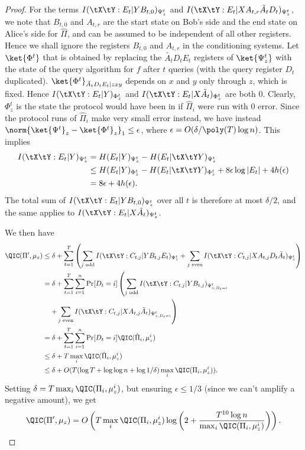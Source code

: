 \begin{proof}
For the terms $I(\tX\tY:E_t|YB_{t,0})_{\Psi^t_z}$ and $I(\tX\tY:E_t|XA_{t,r}\tilde{A}_tD_t)_{\Psi^t_z}$, we note that $B_{t,0}$ and $A_{t,r}$ are the start state on Bob's side and the end state on Alice's side for $\hat{\Pi}$, and can be assumed to be independent of all other registers. Hence we shall ignore the registers $B_{t,0}$ and $A_{t,r}$ in the conditioning systems. Let $\ket{\Phi^t}$ that is obtained by replacing the $\tilde{A_t}D_tE_t$ registers of $\ket{\Psi^t_z}$ with the state of the query algorithm for $f$ after $t$ queries (with the query register $D_t$ duplicated). $\ket{\Phi^t}_{\tilde{A}_tD_tE_t|zxy}$ depends on $x$ and $y$ only through $z$, which is fixed. Hence $I(\tX\tY:E_t|Y)_{\Phi^t_z}$ and $I(\tX\tY:E_t|X\tilde{A}_t)_{\Phi^t_z}$ are both 0. Clearly, $\Phi^t_z$ is the state the protocol would have been in if $\hat{\Pi}_i$ were run with 0 error. Since the protocol runs of $\hat{\Pi}_i$
make very small error instead, we have instead $\norm{\ket{\Psi^t}_z - \ket{\Phi^t}_z}_1 \leq \epsilon$,
where $\epsilon=O(\delta/\poly(T)\log n)$. This implies
\begin{align*}
I(\tX\tY:E_t|Y)_{\Psi^t_z} & = H(E_t|Y)_{\Psi^t_z} - H(E_t|\tX\tY Y)_{\Psi^t_z} \\
 & \leq H(E_t|Y)_{\Phi^t_z} - H(E_t|\tX\tY Y)_{\Phi^t_z} + 8\epsilon\log|E_t| + 4h(\epsilon) \\
 & = 8\epsilon + 4h(\epsilon).
\end{align*}
The total sum of
$I(\tX\tY:E_t|YB_{t,0})_{\Psi^t_z}$ over all $t$ is therefore at most $\delta/2$, and the same applies to $I(\tX\tY:E_t|X\tilde{A}_t)_{\Psi^t_z}$.

We then have
\begin{align*}
\QIC(\Pi',\mu_z)&\le \delta+\sum_{t=1}^T
\left(\sum_{j\text{ odd}} I(\tX\tY:C_{t,j}|YB_{t,j}E_t)_{\Psi^t_z}
    +\sum_{j\text{ even}} I(\tX\tY:C_{t,j}|XA_{t,j}D_t\tilde{A}_t)_{\Psi^t_z}\right)\\
&=\delta+ \sum_{t=1}^T\sum_{i=1}^n\Pr[D_t=i]\left(
    \sum_{j\text{ odd}} I(\tX\tY:C_{t,j}|YB_{t,j})_{\Psi^t_{z,D_t=i}} \right. \\
&   \quad \left. +\sum_{j\text{ even}} I(\tX\tY:C_{t,j}|XA_{t,j}\tilde{A}_t)_{\Psi^t_{z,D_t=i}}\right)\\
&=\delta+\sum_{t=1}^T\sum_{i=1}^n \Pr[D_t=i]\QIC(\hat{\Pi}_i,\mu^i_z)\\
&\le\delta+ T\max_i\QIC(\hat{\Pi}_i,\mu^i_z)\\
&\le\delta+ O(T(\log T+\log\log n+\log 1/\delta)\max_i\QIC(\Pi_i,\mu^i_z)).
\end{align*}
Setting $\delta= T\max_i\QIC(\Pi_i,\mu^i_z)$, but ensuring
$\epsilon\le 1/3$ (since we can't amplify a negative amount), we get
\[\QIC(\Pi',\mu_z)=O\left(T\max_i\QIC(\Pi_i,\mu^i_z)
\log\left(2+\frac{T^{10}\log n}{\max_i\QIC(\Pi_i,\mu^i_z)}\right)\right).
\qedhere\]
\end{proof}

